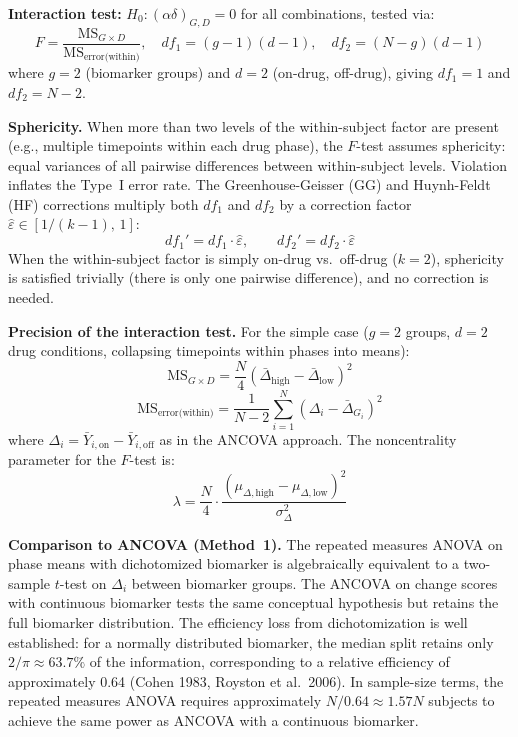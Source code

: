 \documentclass[11pt]{article}
\begin{document}
\textbf{Interaction test:} $H_0: (\alpha\delta)_{G,D} = 0$ for all
combinations, tested via:
\[
F = \frac{\text{MS}_{G \times D}}{\text{MS}_{\text{error(within)}}},
\quad df_1 = (g-1)(d-1), \quad df_2 = (N-g)(d-1)
\]
where $g = 2$ (biomarker groups) and $d = 2$ (on-drug, off-drug), giving
$df_1 = 1$ and $df_2 = N - 2$.

\textbf{Sphericity.} When more than two levels of the within-subject
factor are present (e.g., multiple timepoints within each drug phase),
the $F$-test assumes sphericity: equal variances of all pairwise
differences between within-subject levels. Violation inflates the
Type~I error rate. The Greenhouse-Geisser (GG) and Huynh-Feldt (HF)
corrections multiply both $df_1$ and $df_2$ by a correction factor
$\hat{\varepsilon} \in [1/(k-1),\, 1]$:
\[
df_1' = df_1 \cdot \hat{\varepsilon}, \qquad
df_2' = df_2 \cdot \hat{\varepsilon}
\]
When the within-subject factor is simply on-drug vs.\ off-drug
($k = 2$), sphericity is satisfied trivially (there is only one
pairwise difference), and no correction is needed.

\textbf{Precision of the interaction test.} For the simple case
($g = 2$ groups, $d = 2$ drug conditions, collapsing timepoints within
phases into means):
\[
\text{MS}_{G \times D} =
\frac{N}{4} \left(
\bar{\Delta}_{\text{high}} - \bar{\Delta}_{\text{low}}
\right)^2
\]
\[
\text{MS}_{\text{error(within)}} =
\frac{1}{N-2} \sum_{i=1}^{N}
(\Delta_i - \bar{\Delta}_{G_i})^2
\]
where $\Delta_i = \bar{Y}_{i,\text{on}} - \bar{Y}_{i,\text{off}}$ as
in the ANCOVA approach. The noncentrality parameter for the $F$-test is:
\[
\lambda = \frac{N}{4} \cdot
\frac{(\mu_{\Delta,\text{high}} -
\mu_{\Delta,\text{low}})^2}{\sigma^2_\Delta}
\]

\textbf{Comparison to ANCOVA (Method~1).} The repeated measures ANOVA
on phase means with dichotomized biomarker is algebraically equivalent
to a two-sample $t$-test on $\Delta_i$ between biomarker groups. The
ANCOVA on change scores with continuous biomarker tests the same
conceptual hypothesis but retains the full biomarker distribution. The
efficiency loss from dichotomization is well established: for a normally
distributed biomarker, the median split retains only
$2/\pi \approx 63.7\%$ of the information, corresponding to a relative
efficiency of approximately 0.64 (Cohen 1983, Royston et al.\ 2006). In
sample-size terms, the repeated measures ANOVA requires approximately
$N/0.64 \approx 1.57N$ subjects to achieve the same power as ANCOVA
with a continuous biomarker.
\end{document}
